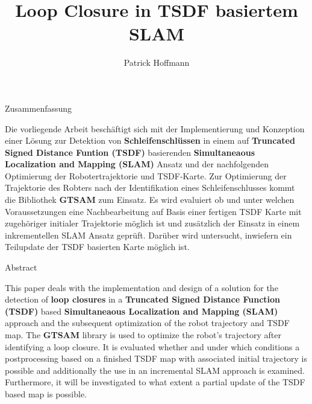 \documentclass[german, master, utf8, pdftex, dvipsnames]{base/thesis_KBS}
\begin{document}
\title{Loop Closure in TSDF basiertem SLAM} %

\author{Patrick Hoffmann}

\generatetitle

\cleardoublepage

\begin{prefacesection}{Zusammenfassung}

Die vorliegende Arbeit beschäftigt sich mit der Implementierung und Konzeption einer Lösung zur Detektion von \textbf{Schleifenschlüssen} in einem auf \textbf{Truncated Signed Distance Funtion (TSDF)} basierenden \textbf{Simultaneaous Localization and Mapping (SLAM)} Ansatz und der nachfolgenden Optimierung der Robotertrajektorie und TSDF-Karte.
Zur Optimierung der Trajektorie des Robters nach der Identifikation eines Schleifenschlusses kommt die Bibliothek \textbf{GTSAM} zum Einsatz.
Es wird evaluiert ob und unter welchen Voraussetzungen eine Nachbearbeitung auf Basis einer fertigen TSDF Karte mit zugehöriger initialer Trajektorie möglich ist und zusätzlich der Einsatz in einem inkrementellen SLAM Ansatz geprüft.
Darüber wird untersucht, inwiefern ein Teilupdate der TSDF basierten Karte möglich ist.

\end{prefacesection}

\vspace{5cm}

\begin{prefacesection}{Abstract}

This paper deals with the implementation and design of a solution for the detection of \textbf{loop closures} in a \textbf{Truncated Signed Distance Function (TSDF)} based \textbf{Simultaneaous Localization and Mapping (SLAM)} approach and the subsequent optimization of the robot trajectory and TSDF map.
The \textbf{GTSAM} library is used to optimize the robot's trajectory after identifying a loop closure.
It is evaluated whether and under which conditions a postprocessing based on a finished TSDF map with associated initial trajectory is possible and additionally the use in an incremental SLAM approach is examined.
Furthermore, it will be investigated to what extent a partial update of the TSDF based map is possible.

\end{prefacesection}
\end{document}
